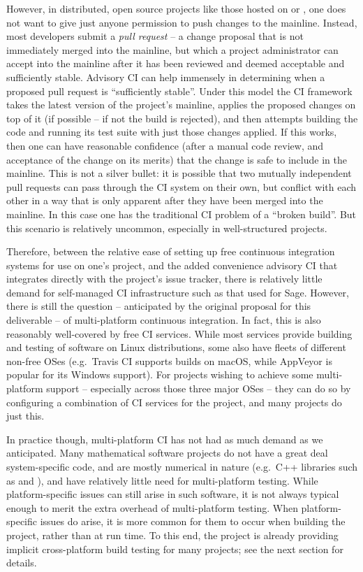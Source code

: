 \documentclass{deliverablereport}
\begin{document}
However, in distributed, open source projects like those hosted on \GitHub or
\GitLab, one does not want to give just anyone permission to push changes to
the mainline.  Instead, most developers submit a {\em pull request} -- a change
proposal that is not immediately merged into the mainline, but which a project
administrator can accept into the mainline after it has been reviewed and
deemed acceptable and sufficiently stable.  Advisory CI can help immensely in
determining when a proposed pull request is ``sufficiently stable''.  Under
this model the CI framework takes the latest version of the project's mainline,
applies the proposed changes on top of it  (if possible -- if not the build is rejected), and then
attempts building the code and running its test suite with just those changes
applied.  If this works, then one can have reasonable confidence (after a
manual code review, and acceptance of the change on its merits) that the change
is safe to include in the mainline.  This is not a silver bullet: it is
possible that two mutually independent pull requests can pass through the CI
system on their own, but conflict with each other in a way that is only
apparent after they have been merged into the mainline.  In this case one has
the traditional CI problem of a ``broken build''.  But this scenario is
relatively uncommon, especially in well-structured projects.

Therefore, between the relative ease of setting up free continuous integration
systems for use on one's project, and the added convenience advisory CI that
integrates directly with the project's issue tracker, there is relatively
little demand for self-managed CI infrastructure such as that used for Sage.
However, there is still the question -- anticipated by the original proposal
for this deliverable -- of multi-platform continuous integration.  In fact,
this is also reasonably well-covered by free CI services.  While most services
provide building and testing of software on Linux distributions, some also have
fleets of different non-free OSes (e.g.~Travis CI supports builds on macOS,
while AppVeyor is popular for its Windows support).  For projects wishing to
achieve some multi-platform support -- especially across those three major OSes
-- they can do so by configuring a combination of CI services for the project,
and many projects do just this.

In practice though, multi-platform CI has not had as much demand as we
anticipated.  Many mathematical software projects do not have a great deal
system-specific code, and are mostly numerical in nature (e.g.~C++ libraries
such as \Linbox and \Givaro), and have relatively little need for
multi-platform testing.  While platform-specific issues can still arise in such
software, it is not always typical enough to merit the extra overhead of
multi-platform testing.  When platform-specific issues do arise, it is more
common for them to occur when building the project, rather than at run time.
To this end, the \Sage project is already providing implicit cross-platform
build testing for many projects; see the next section for details.
\end{document}
